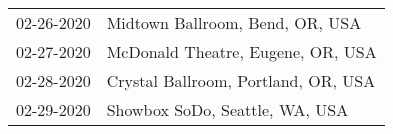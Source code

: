 \begin{supertabular}{ll}
 02-26-2020 &      Midtown Ballroom, Bend, OR, USA \\
 02-27-2020 &    McDonald Theatre, Eugene, OR, USA \\
 02-28-2020 &  Crystal Ballroom, Portland, OR, USA \\
 02-29-2020 &       Showbox SoDo, Seattle, WA, USA \\
\end{supertabular}
